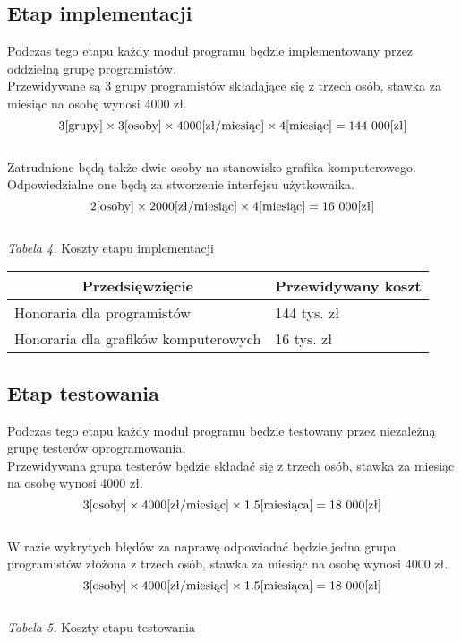 \documentclass 	[11pt, a4paper, leqno]	{article}					%
\begin{document}
\subsection{Etap implementacji}
\noindent
Podczas tego etapu każdy moduł programu będzie implementowany przez oddzielną grupę programistów. \\
Przewidywane są 3 grupy programistów składające się z trzech osób, stawka za miesiąc na osobę wynosi 4000 zł. \\
\begin{equation}3 \text{[grupy]} \times 3 \text{[osoby]} \times 4000 \text{[zł/miesiąc]} \times  4 \text{[miesiąc]} = 144\\\ 000 \text{[zł]} \end{equation} \\
Zatrudnione będą także dwie osoby na stanowisko grafika komputerowego. Odpowiedzialne one będą za stworzenie interfejsu użytkownika. \\
\begin{equation}2 \text{[osoby]} \times 2000 \text{[zł/miesiąc]} \times 4 \text{[miesiąc]} = 16\\\ 000 \text{[zł]} \end{equation} \\
\newpage
\textit{Tabela 4.} Koszty etapu implementacji

\begin{center}
	\begin{tabular}{| l | l |}
		\hline
		\multicolumn{1}{|c|}{Przedsięwzięcie} & 
		\multicolumn{1}{|c|}{Przewidywany koszt} \\ \hline \hline
		Honoraria dla programistów & 144 tys. zł \\ \hline
		Honoraria dla grafików komputerowych & 16 tys. zł \\ \hline
	\end{tabular}
\end{center}

\subsection{Etap testowania}
\noindent
Podczas tego etapu każdy moduł programu będzie testowany przez niezależną grupę testerów oprogramowania. \\
Przewidywana grupa testerów będzie składać się z trzech osób, stawka za miesiąc na osobę wynosi 4000 zł. \\
\begin{equation}3 \text{[osoby]} \times 4000 \text{[zł/miesiąc]} \times 1.5 \text{[miesiąca]} = 18\\\ 000 \text{[zł]} \end{equation} \\
W razie wykrytych błędów za naprawę odpowiadać będzie jedna grupa programistów złożona z trzech osób, stawka za miesiąc na osobę wynosi 4000 zł. \\
\begin{equation}3 \text{[osoby]} \times 4000 \text{[zł/miesiąc]} \times 1.5 \text{[miesiąca]} = 18\\\ 000 \text{[zł]} \end{equation} \\
\textit{Tabela 5.} Koszty etapu testowania
\end{document}
